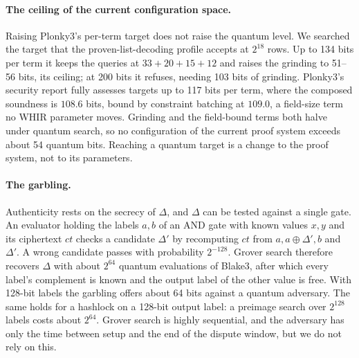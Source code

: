 \documentclass[11pt]{article}
\newcommand{\AND}{\textsf{AND}}
\begin{document}
\paragraph{The ceiling of the current configuration space.} Raising Plonky3's
per-term target does not raise the quantum level. We searched the target that
the proven-list-decoding profile accepts at $2^{18}$ rows. Up to 134 bits per term
it keeps the queries at $33+20+15+12$ and raises the grinding to 51--56 bits,
its ceiling; at 200 bits it refuses, needing 103 bits of grinding. Plonky3's
security report fully assesses targets up to 117 bits per term, where the
composed soundness is $108.6$ bits, bound by constraint batching at $109.0$, a
field-size term no WHIR parameter moves. Grinding and the field-bound terms both
halve under quantum search, so no configuration of the current proof system
exceeds about 54 quantum bits. Reaching a quantum target is a change to the
proof system, not to its parameters.

\paragraph{The garbling.} Authenticity rests on the secrecy of $\Delta$, and
$\Delta$ can be tested against a single gate. An evaluator holding the labels
$a,b$ of an \AND{} gate with known values $x,y$ and its ciphertext $\mathit{ct}$
checks a candidate $\Delta'$ by recomputing $\mathit{ct}$ from
$a,a\oplus\Delta',b$ and $\Delta'$. A wrong candidate passes with probability
$2^{-128}$. Grover search therefore recovers $\Delta$ with about $2^{64}$
quantum evaluations of Blake3, after which every label's complement is known
and the output label of the other value is free. With 128-bit labels the
garbling offers about 64 bits against a quantum adversary. The same holds for a
hashlock on a 128-bit output label: a preimage search over $2^{128}$ labels costs
about $2^{64}$. Grover search is highly sequential, and the adversary has only the
time between setup and the end of the dispute window, but we do not rely on
this.
\end{document}
